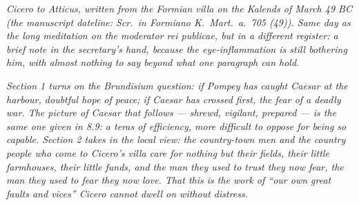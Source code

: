 
\textit{Cicero to Atticus, written from the Formian
villa on the Kalends of March 49 BC (the manuscript
dateline: \textit{Scr.\ in Formiano K.\ Mart.\ a.\ 705
(49)}). Same day as the long meditation on the
\textit{moderator rei publicae}, but in a different
register: a brief note in the secretary's hand, because
the eye-inflammation is still bothering him, with
almost nothing to say beyond what one paragraph can
hold.}

\textit{Section 1 turns on the Brundisium question: if
Pompey has caught Caesar at the harbour, doubtful hope
of peace; if Caesar has crossed first, the fear of a
deadly war. The picture of Caesar that follows ---
shrewd, vigilant, prepared --- is the same one given in
8.9: a \textit{teras} of efficiency, more difficult to
oppose for being so capable. Section 2 takes in the
local view: the country-town men and the country people
who come to Cicero's villa care for nothing but their
fields, their little farmhouses, their little funds, and
the man they used to trust they now fear, the man they
used to fear they now love. That this is the work of
``our own great faults and vices'' Cicero cannot dwell
on without distress.}
